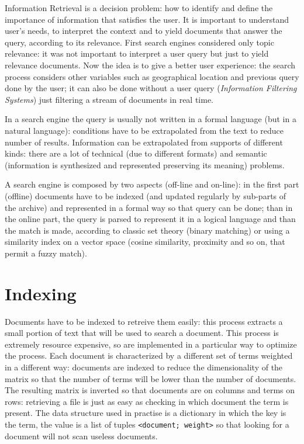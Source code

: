 \documentclass[11pt, a4page]{article}
\begin{document}
Information Retrieval is a decision problem: how to identify and define the importance of information that satisfies the user.
It is important to understand user's needs, to interpret the context and to yield documents that answer the query, according to its relevance.
First search engines considered only topic relevance: it was not important to interpret a user query but just to yield relevance documents.
Now the idea is to give a better user experience: the search process considers other variables such as geographical location and previous query done by the user; it can also be done without a user query (\textit{Information Filtering Systems}) just filtering a stream of documents in real time.

In a search engine the query is usually not written in a formal language (but in a natural language): conditions have to be extrapolated from the text to reduce number of results.
Information can be extrapolated from supports of different kinds: there are a lot of technical (due to different formats) and semantic (information is synthesized and represented preserving its meaning) problems.

A search engine is composed by two aspects (off-line and on-line): in the first part (offline) documents have to be indexed (and updated regularly by sub-parts of the archive) and represented in a formal way so that query can be done; than in the online part, the query is parsed to represent it in a logical language and than the match is made, according to classic set theory (binary matching) or using a similarity index on a vector space (cosine similarity, proximity and so on, that permit a fuzzy match).

\section{Indexing}
Documents have to be indexed to retreive them easily: this process extracts a small portion of text that will be used to search a document.
This process is extremely resource expensive, so are implemented in a particular way to optimize the process. 
Each document is characterized by a different set of terms weighted in a different way: documents are indexed to reduce the dimensionality of the matrix so that the number of terms will be lower than the number of documents.
The resulting matrix is inverted so that documents are on columns and terms on rows: retrieving a file is just as easy as checking in which document the term is present.
The data structure used in practise is a dictionary in which the key is the term, the value is a list of tuples \verb|<document; weight>| so that looking for a document will not scan useless documents.
\end{document}
